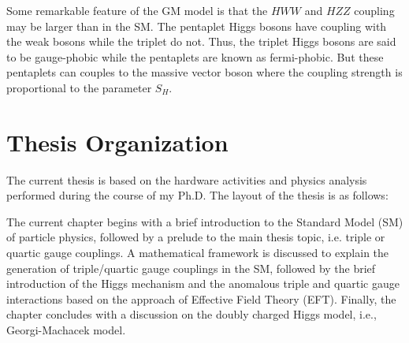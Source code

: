 Some remarkable feature of the GM model is that the $HWW$ and $HZZ$ coupling may be larger than in the SM. 
The pentaplet Higgs bosons have coupling with the weak bosons while the triplet do not. Thus, the triplet Higgs bosons are said to be gauge-phobic while the pentaplets are known as fermi-phobic.
But these pentaplets can couples to the massive vector boson where the coupling strength is proportional to the parameter $S_H$.










\section{Thesis Organization} %
\label{sec:thesis_organization}
The current thesis is based on the hardware activities and physics analysis performed during the course of my Ph.D. The layout of the thesis is as follows:


The current chapter begins with a brief introduction to the Standard Model (SM) of particle physics, followed by a prelude to the main thesis topic, i.e. triple or quartic gauge couplings. A mathematical framework is discussed to explain the generation of triple/quartic gauge couplings in the SM, followed by the brief introduction of the Higgs mechanism and the anomalous triple and quartic gauge interactions based on the approach of Effective Field Theory (EFT). Finally, the chapter concludes with a discussion on the doubly charged Higgs model, i.e., Georgi-Machacek model.

